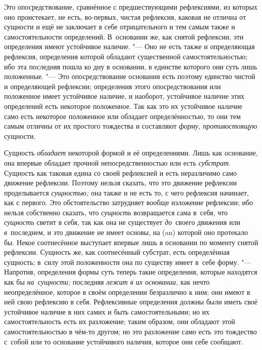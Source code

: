 Это опосредствование, сравнённое с предшествующими рефлексиями, из которых оно
проистекает, не есть, во-первых, чистая рефлексия, каковая не отлична от
сущности и ещё не заключает в себе отрицательного и тем самым также и
самостоятельности определений. В~основании же, как снятой рефлексии, эти
определения имеют устойчивое наличие. "--- Оно не есть также и определяющая
рефлексия, определения которой обладают существенной самостоятельностью; ибо
эта последняя пошла ко дну в основании, в единстве которого они суть лишь
положенные. "--- Это опосредствование основания есть поэтому единство чистой и
определяющей рефлексии; определения этого опосредствования или положенное имеет
устойчивое наличие, и наоборот, устойчивое наличие этих определений есть
некоторое положенное. Так как это их устойчивое наличие само есть некоторое
положенное или обладает определённостью, то они тем самым отличны от их
простого тождества и составляют {\em форму, противостоящую} сущности.

Сущность {\em обладает} некоторой формой и её определениями. Лишь как
основание, она впервые обладает прочной непосредственностью или есть
{\em субстрат}. Сущность как таковая едина со своей рефлексией и есть
неразличимо само движение рефлексии. Поэтому нельзя сказать, что это движение
рефлексии проделывается {\em сущностью;} она также и не есть то, с чего
рефлексия начинает, как с первого. Это обстоятельство затрудняет вообще
изложение рефлексии; ибо нельзя собственно сказать, что {\em сущность}
возвращается сама в~себя, что {\em сущность} светит в себя, так как она не
существует {\em до}~своего движения или {\em в}~последнем, и это движение не
имеет основы, на (an) которой оно протекало бы. Некое соотнесённое выступает
впервые лишь в основании по моменту снятой рефлексии. Сущность же, как
соотнесённый субстрат, есть определённая сущность; в~силу этой положенности она
по существу имеет в~себе форму. "--- Напротив, определения формы суть теперь
такие определения, которые находятся как бы {\em на~сущности;} последняя
{\em лежит в их основании,} как нечто неопределённое, которое в своём
определении безразлично к ним; они имеют в ней свою рефлексию в себя.
Рефлексивные определения должны были иметь своё устойчивое наличие в них самих
и быть самостоятельными; но их самостоятельность есть их разложение; таким
образом, они обладают этой самостоятельностью в чём-то другом; но это
разложение само есть это тождество с~собой или то основание устойчивого
наличия, которое они себе сообщают.

